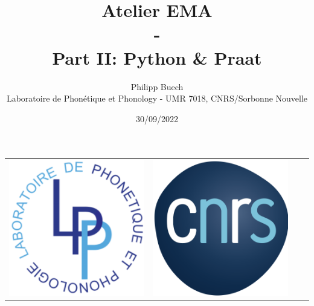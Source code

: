 \documentclass[12pt,a4paper]{beamer}
\title{Atelier EMA\\ - \\Part II: Python \& Praat}
\author{Philipp Buech\\{\scriptsize Laboratoire de Phonétique et Phonology - UMR 7018, CNRS/Sorbonne Nouvelle}}
\date{30/09/2022}
\begin{document}
\begin{frame}[plain]
    \maketitle
    \centering
    \begin{tabular}{cccc}
        \includegraphics[scale=0.075]{../pictures/LPP_logo.png}  &
        \includegraphics[scale=0.075]{../pictures/CNRS_logo.png} & 

\end{tabular}
\end{frame}
\end{document}
